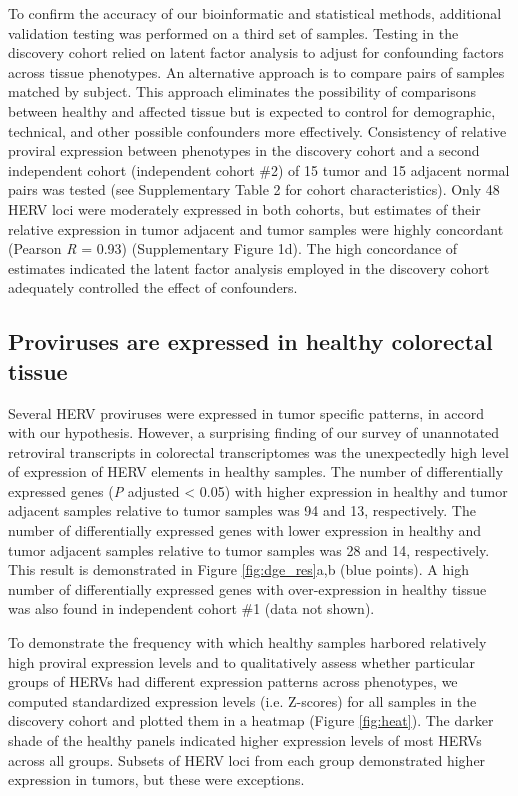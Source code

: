 To confirm the accuracy of our bioinformatic and statistical methods, additional validation testing was performed on a third set of samples.
Testing in the discovery cohort relied on latent factor analysis to adjust for confounding factors across tissue phenotypes.
An alternative approach is to compare pairs of samples matched by subject.
This approach eliminates the possibility of comparisons between healthy and affected tissue but is expected to control for demographic, technical, and other possible confounders more effectively.
Consistency of relative proviral expression between phenotypes in the discovery cohort and a second independent cohort (independent cohort \#2) of 15 tumor and 15 adjacent normal pairs was tested (see Supplementary Table 2 for cohort characteristics).
Only 48 HERV loci were moderately expressed in both cohorts, but estimates of their relative expression in tumor adjacent and tumor samples were highly concordant (Pearson \emph{R} = 0.93) (Supplementary Figure 1d).
The high concordance of estimates indicated the latent factor analysis employed in the discovery cohort adequately controlled the effect of confounders.

\subsection*{Proviruses are expressed in healthy colorectal tissue}
Several HERV proviruses were expressed in tumor specific patterns, in accord with our hypothesis.
However, a surprising finding of our survey of unannotated retroviral transcripts in colorectal transcriptomes was the unexpectedly high level of expression of HERV elements in healthy samples.
The number of differentially expressed genes (\emph{P} adjusted < 0.05) with higher expression in healthy and tumor adjacent samples relative to tumor samples was 94 and 13, respectively.
The number of differentially expressed genes with lower expression in healthy and tumor adjacent samples relative to tumor samples was 28 and 14, respectively.
This result is demonstrated in Figure \ref{fig:dge_res}a,b (blue points).
A high number of differentially expressed genes with over-expression in healthy tissue was also found in independent cohort \#1 (data not shown).

To demonstrate the frequency with which healthy samples harbored relatively high proviral expression levels and to qualitatively assess whether particular groups of HERVs had different expression patterns across phenotypes, we computed standardized expression levels (i.e. Z-scores) for all samples in the discovery cohort and plotted them in a heatmap (Figure \ref{fig:heat}).
The darker shade of the healthy panels indicated higher expression levels of most HERVs across all groups.
Subsets of HERV loci from each group demonstrated higher expression in tumors, but these were exceptions.

